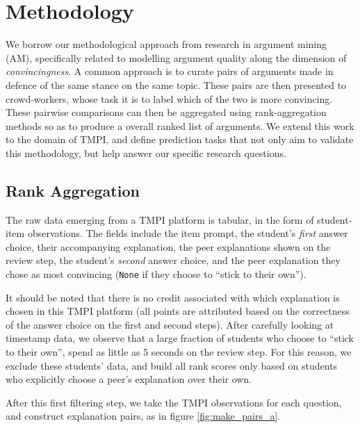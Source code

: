 \documentclass[notitlepage,12pt]{jedm}
\begin{document}
\section{Methodology}\label{sec:methodology}

We borrow our methodological approach from research in argument mining (AM), 
specifically related to modelling argument quality along the dimension of 
\textit{convincingness}.
A common approach is to curate pairs of arguments made in defence of the same 
stance on the same topic.
These pairs are then presented to crowd-workers, whose task it is to label 
which of the two is more convincing. 
These pairwise comparisons can then be aggregated using rank-aggregation 
methods so as to produce a overall ranked list of arguments.
We extend this work to the domain of TMPI, and define prediction tasks that not 
only aim to validate this methodology, but help answer our specific research 
questions.

\subsection{Rank Aggregation}
The raw data emerging from a TMPI platform is tabular, in the form of 
student-item observations.
The fields include the item prompt, the student's \textit{first} answer choice, 
their accompanying explanation, the peer explanations shown on the review step, 
the student's \textit{second} answer choice, and the peer explanation they 
chose as most convincing (\verb|None| if they choose to ``stick to their own'').

It should be noted that there is no credit associated with which explanation is 
chosen in this TMPI platform (all points are attributed based on the 
correctness of the answer choice on the first and second steps).
After carefully looking at timestamp data, we observe that a large fraction of 
students who choose to ``stick to their own'', spend as little as 5 seconds on 
the review step.
For this reason, we exclude these students' data, and build all rank scores 
only based on students who explicitly choose a peer's explanation over their 
own.

After this first filtering step, we take the TMPI observations for each 
question, and construct explanation pairs, as in figure 
\ref{fig:make_pairs_a}.
\end{document}

